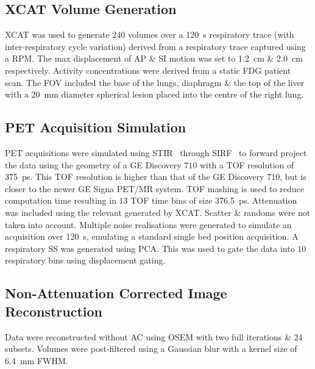    \subsection{XCAT Volume Generation} \label{sec:xcat_volume_generation}
        \gls{XCAT}%
        was used to generate $240$ volumes over a \SI{120}{\second} respiratory trace (with inter-respiratory cycle variation) derived from a respiratory trace captured using a \gls{RPM}. The max displacement of \gls{AP} \& \gls{SI} motion was set to \SI{1.2}{\centi\metre} \& \SI{2.0}{\centi\metre} respectively. Activity concentrations were derived from a static \gls{FDG} patient scan. The \gls{FOV} included the base of the lungs, diaphragm \& the top of the liver with a \SI{20}{\milli\metre} diameter spherical lesion placed into the centre of the right lung.
    
    \subsection{PET Acquisition Simulation} \label{sec:pet_acquisition_simulation}
        \gls{PET} acquisitions were simulated %
        using \gls{STIR}~\cite{Thielemans2012, Efthimiou2018} through \gls{SIRF}~\cite{ Ovtchinnikov2019CCPPETMRSIRF} to forward project the data using the geometry of a \gls{GE} Discovery $710$ with a \gls{TOF} resolution of \SI{375}{\pico\second}. This \gls{TOF} resolution is higher than that of the \gls{GE} Discovery 710, but is closer to the newer \gls{GE} Signa \gls{PET}/\gls{MR} system. \gls{TOF} mashing is used to reduce computation time resulting in $13$ \gls{TOF} time bins of size \SI{376.5}{\pico\second}. Attenuation was included using the relevant  generated by \gls{XCAT}. Scatter \& randoms were not taken into account. Multiple noise realisations were generated to simulate an acquisition over \SI{120}{\second}, emulating a standard single bed position acquisition. A respiratory \gls{SS} was generated using \gls{PCA}.%
        This was used to gate the data into $10$ respiratory bins using displacement gating.%
    
    \subsection{Non-Attenuation Corrected Image Reconstruction} \label{sec:non-attenuation_corrected_image_reconstruction}
        Data were reconstructed without \gls{AC} using \gls{OSEM} with two full iterations \& $24$ subsets.%
        Volumes were post-filtered using a Gaussian blur with a kernel size of \SI{6.4}{\milli\metre} \gls{FWHM}.
    
